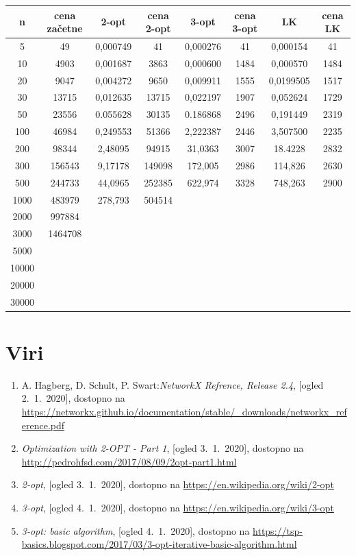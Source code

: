 \documentclass[12pt, a4paper]{article}
\begin{document}
\begin{table}[]
\begin{tabular}{|c|c|c|c|c|c|c|c|}
\hline
n&cena začetne&2-opt&cena 2-opt&3-opt&cena 3-opt&LK&cena LK\\\hline
5&49&0,000749&41&0,000276&41&0,000154&41\\\hline
10&4903&0,001687&3863&0,000600&1484&0,000570&1484\\\hline
20&9047&0,004272&9650&0,009911&1555&0,0199505&1517\\\hline
30&13715&0,012635&13715&0,022197&1907&0,052624&1729\\\hline
50&23556&0.055628&30135&0.186868&2496&0,191449&2319\\\hline
100&46984&0,249553&51366&2,222387&2446&3,507500&2235\\\hline
200&98344&2,48095&94915&31,0363&3007&18.4228&2832\\\hline
300&156543&9,17178&149098&172,005&2986&114,826&2630\\\hline
500&244733&44,0965&252385&622,974&3328&748,263&2900\\\hline
1000&483979&278,793&504514&&&&\\\hline
2000&997884&&&&&&\\\hline
3000&1464708&&&&&&\\\hline
5000&&&&&&&\\\hline
10000&&&&&&&\\\hline
20000&&&&&&&\\\hline
30000&&&&&&&\\\hline
\end{tabular}
\end{table}


\newpage
\section[Viri]{Viri}

\begin{enumerate}

\item A. Hagberg, D. Schult, P. Swart:\emph{NetworkX Refrence, Release 2.4}, [ogled 2.~1.~2020], dostopno na \url{https://networkx.github.io/documentation/stable/_downloads/networkx_reference.pdf}

\item \emph{Optimization with 2-OPT - Part 1}, [ogled 3.~1.~2020], dostopno na \url{http://pedrohfsd.com/2017/08/09/2opt-part1.html}

\item \emph{2-opt}, [ogled 3.~1.~2020], dostopno na \url{https://en.wikipedia.org/wiki/2-opt}

\item \emph{3-opt}, [ogled 4.~1.~2020], dostopno na \url{https://en.wikipedia.org/wiki/3-opt}

\item \emph{3-opt: basic algorithm}, [ogled 4.~1.~2020], dostopno na \url{https://tsp-basics.blogspot.com/2017/03/3-opt-iterative-basic-algorithm.html}
\end{enumerate}
\end{document}
